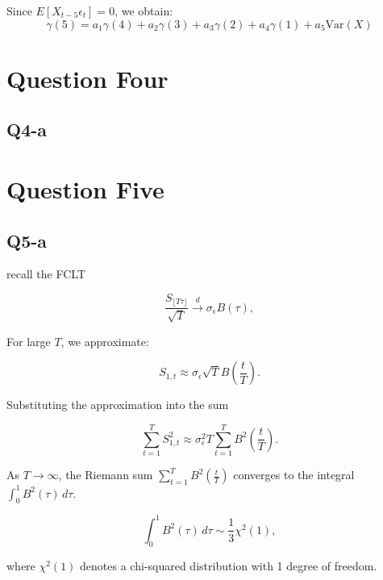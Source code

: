 \documentclass{article} %
\begin{document}
Since \( E[X_{t-5} \epsilon_t] = 0 \), we obtain:
\begin{equation}
 \gamma(5) = a_1 \gamma(4) + a_2 \gamma(3) + a_3 \gamma(2) + a_4 \gamma(1) + a_5 \text{Var}(X)
\end{equation}




\section*{Question Four}
\subsection{Q4-a}
\section*{Question Five}
\subsection{Q5-a}
recall the FCLT 

\begin{equation}
 \frac{S_{\lfloor T \tau \rfloor}}{\sqrt{T}} \overset{d}{\longrightarrow} \sigma_{\epsilon} B(\tau),
\end{equation}


For large \( T \), we approximate:

\begin{equation}
   S_{1,t} \approx \sigma_{\epsilon} \sqrt{T} B\left(\frac{t}{T}\right).
\end{equation}

Substituting the approximation into the sum

\begin{equation}
   \sum_{t=1}^{T} S_{1,t}^2 \approx \sigma_{\epsilon}^2 T \sum_{t=1}^{T} B^2\left(\frac{t}{T}\right).
\end{equation}


 As \( T \to \infty \), the Riemann sum \( \sum_{t=1}^{T} B^2\left(\frac{t}{T}\right) \) converges to the integral \( \int_{0}^{1} B^2(\tau) \, d\tau \).

\begin{equation}
   \int_{0}^{1} B^2(\tau) \, d\tau \sim \frac{1}{3} \chi^2(1),
\end{equation}

where \( \chi^2(1) \) denotes a chi-squared distribution with 1 degree of freedom.
\end{document}

